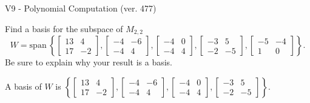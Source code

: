 \begin{exercise}
  \begin{exerciseTitle}V9 - Polynomial Computation (ver. 477)\end{exerciseTitle}
  \begin{exerciseStatement}
    Find a basis for the subspace of \(M_{2,2}\) 
\[W=\mathrm{span}\ \left\{\left[\begin{array}{cc}
13 & 4 \\
17 & -2
\end{array}\right] , \left[\begin{array}{cc}
-4 & -6 \\
-4 & 4
\end{array}\right] , \left[\begin{array}{cc}
-4 & 0 \\
-4 & 4
\end{array}\right] , \left[\begin{array}{cc}
-3 & 5 \\
-2 & -5
\end{array}\right] , \left[\begin{array}{cc}
-5 & -4 \\
1 & 0
\end{array}\right]\right\}.\]
 Be sure to explain why your result is a basis.


  \end{exerciseStatement}
  \begin{exerciseAnswer}
   A basis of \(W\) is  \(\left\{\left[\begin{array}{cc}
13 & 4 \\
17 & -2
\end{array}\right] , \left[\begin{array}{cc}
-4 & -6 \\
-4 & 4
\end{array}\right] , \left[\begin{array}{cc}
-4 & 0 \\
-4 & 4
\end{array}\right] , \left[\begin{array}{cc}
-3 & 5 \\
-2 & -5
\end{array}\right]\right\}\).
  


  \end{exerciseAnswer}
\end{exercise}